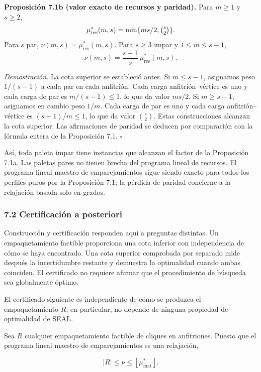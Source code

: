 \documentclass[spanish,11pt,a4paper]{article}
\begin{document}
\textbf{Proposición 7.1b (valor exacto de recursos y paridad).} Para
\(m\ge1\) y \(s\ge2\), \[
\mu^*_{\mathrm{res}}(m,s)=\min\{ms/2,\tbinom{s}{2}\}.
\] Para \(s\) par, \(\nu(m,s)=\mu^*_{\mathrm{res}}(m,s)\). Para
\(s\ge3\) impar y \(1\le m\le s-1\), \[
\nu(m,s)=\frac{s-1}{s}\,\mu^*_{\mathrm{res}}(m,s).
\]

\emph{Demostración.} La cota superior se estableció antes. Si
\(m\le s-1\), asignamos peso \(1/(s-1)\) a cada par en cada anfitrión.
Cada carga anfitrión--vértice es uno y cada carga de par es
\(m/(s-1)\le1\), lo que da valor \(ms/2\). Si \(m\ge s-1\), asignamos en
cambio peso \(1/m\). Cada carga de par es uno y cada carga
anfitrión--vértice es \((s-1)/m\le1\), lo que da valor \(\binom{s}{2}\).
Estas construcciones alcanzan la cota superior. Las afirmaciones de
paridad se deducen por comparación con la fórmula entera de la
Proposición 7.1. \(\square\)

Así, toda paleta impar tiene instancias que alcanzan el factor de la
Proposición 7.1a. Las paletas pares no tienen brecha del programa lineal
de recursos. El programa lineal maestro de emparejamientos sigue siendo
exacto para todos los perfiles puros por la Proposición 7.1; la pérdida
de paridad concierne a la relajación basada solo en grados.

\subsubsection{7.2 Certificación a
posteriori}\label{certificaciuxf3n-a-posteriori}

Construcción y certificación responden aquí a preguntas distintas. Un
empaquetamiento factible proporciona una cota inferior con independencia
de cómo se haya encontrado. Una cota superior comprobada por separado
mide después la incertidumbre restante y demuestra la optimalidad cuando
ambas coinciden. El certificado no requiere afirmar que el procedimiento
de búsqueda sea globalmente óptimo.

El certificado siguiente es independiente de cómo se produzca el
empaquetamiento \(R\); en particular, no depende de ninguna propiedad de
optimalidad de SEAL.

Sea \(R\) cualquier empaquetamiento factible de cliques en anfitriones.
Puesto que el programa lineal maestro de emparejamientos es una
relajación,

\[
|R|
\le
\nu
\le
\left\lfloor\mu^*_{\mathrm{mat}}\right\rfloor.
\]
\end{document}
